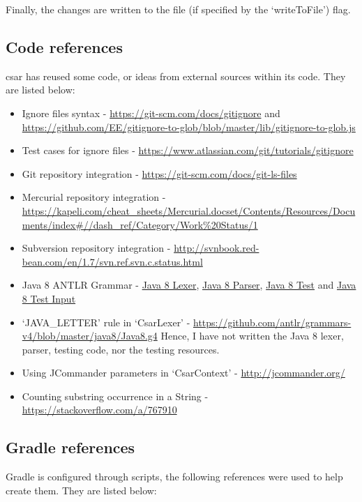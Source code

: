 \documentclass[12pt, letterpaper]{article}
\begin{document}
Finally, the changes are written to the file (if specified by the `writeToFile') flag.

\subsection{Code references}
\label{sec:CodeReferences}
csar has reused some code, or ideas from external sources within its code. They are listed below:
\begin{itemize}
  \item Ignore files syntax - \url{https://git-scm.com/docs/gitignore} and \url{https://github.com/EE/gitignore-to-glob/blob/master/lib/gitignore-to-glob.js}
  \item Test cases for ignore files - \url{https://www.atlassian.com/git/tutorials/gitignore}
  \item Git repository integration - \url{https://git-scm.com/docs/git-ls-files}
  \item Mercurial repository integration - \url{https://kapeli.com/cheat_sheets/Mercurial.docset/Contents/Resources/Documents/index#//dash_ref/Category/Work%20Status/1}
  \item Subversion repository integration - \url{http://svnbook.red-bean.com/en/1.7/svn.ref.svn.c.status.html}
  \item Java 8 ANTLR Grammar - \href{https://github.com/antlr/grammars-v4/blob/02711067f82bed8e0c8dfd25e80f4f8ae2472abd/java8-pt/JavaLexer.g4}{Java 8 Lexer}, \href{https://github.com/antlr/grammars-v4/blob/02711067f82bed8e0c8dfd25e80f4f8ae2472abd/java8-pt/JavaParser.g4}{Java 8 Parser}, \href{https://github.com/antlr/grammars-v4/blob/02711067f82bed8e0c8dfd25e80f4f8ae2472abd/_grammar-test/src/test/java/TestJava8pt.java}{Java 8 Test} and \href{https://github.com/antlr/grammars-v4/blob/02711067f82bed8e0c8dfd25e80f4f8ae2472abd/java8-pt/examples/AllInOne8.java}{Java 8 Test Input}
  \item `JAVA\_LETTER' rule in `CsarLexer' - \url{https://github.com/antlr/grammars-v4/blob/master/java8/Java8.g4}
  Hence, I have not written the Java 8 lexer, parser, testing code, nor the testing resources.
  \item Using JCommander parameters in `CsarContext' - \url{http://jcommander.org/}
  \item Counting substring occurrence in a String - \url{https://stackoverflow.com/a/767910}
\end{itemize}

\subsection{Gradle references}
Gradle is configured through scripts, the following references were used to help create them. They are listed below:
\end{document}
